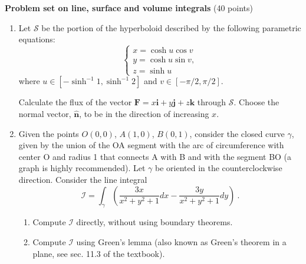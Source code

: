 \documentclass[fleqn]{article}
\begin{document}

  \textbf{Problem set on line, surface and volume integrals} (40 points)
  \begin{enumerate}

    \item Let ${\mathcal S}$ be the portion of the hyperboloid 
    described by the following parametric equations:
    \begin{equation} 
      \begin{cases} 
      x = \cosh u \cos v  \nonumber \\
      y = \cosh u \sin v,  \nonumber \\
      z = \sinh u  \nonumber 
      \end{cases}
    \end{equation} 
    where $u \in \left[-\sinh^{-1} 1, \sinh^{-1} 2 \right]$ and $v \in \left[-\pi/2, \pi/2 \right]$. 
    
    Calculate the flux of the vector $\mathbf{F} = x\mathbf{i }+ y\mathbf{j }+ z\mathbf{k}$ through ${\mathcal S}$. Choose the normal vector, $\mathbf{\hat{n}}$, to be in the direction of increasing $x$.
    
    
    \item Given the points $O (0, 0)$, $A (1, 0)$, $B (0, 1)$, consider the closed curve $\gamma$, given by the union of the OA segment
    with the arc of circumference with center O and radius 1 that connects A with B and with the segment BO (a graph is highly recommended). Let $\gamma$ be oriented in the 
    counterclockwise direction. Consider the line integral
    $${\mathcal I} = \int_{\gamma} \left(\frac{3x}{x^2 + y^2 +1} dx-\frac{3y}{x^2 + y^2 +1} dy
       \right)~.
       $$
      \begin{enumerate}
        \item Compute  ${\mathcal I}$ directly, without using boundary theorems. 
        
        \item Compute  ${\mathcal I}$ using Green's lemma (also known as Green's theorem in a plane, see sec. 11.3 of the textbook). 
      \end{enumerate}
    

\end{enumerate}
\end{document}
